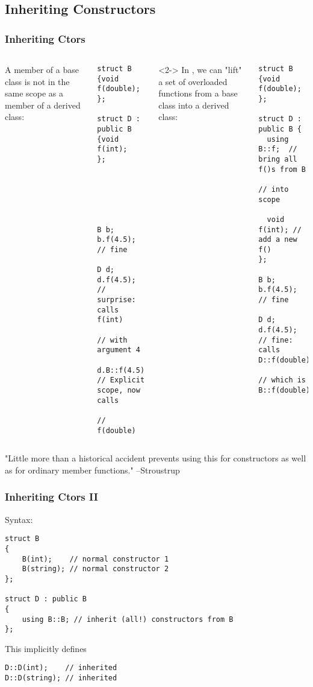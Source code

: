 \subsection{Inheriting Constructors}

\begin{frame}[fragile]
\frametitle{Inheriting Ctors}

\begin{columns}[t]
A member of a base class is not in the same scope as a member of a derived class:
{\scriptsize
\begin{verbatim}
struct B            {void f(double); };

struct D : public B {void f(int);    };






B b;   b.f(4.5);  // fine

D d;   d.f(4.5);  // surprise: calls f(int)
                  // with argument 4

d.B::f(4.5)  // Explicit scope, now calls
             // f(double)
\end{verbatim}
}
<2->
In , we can "lift" a set of overloaded functions from a base class into a derived class:
{\scriptsize
\begin{verbatim}
struct B {void f(double);  };

struct D : public B {
  using B::f;  // bring all f()s from B
               // into scope

  void f(int); // add a new f()
};

B b;   b.f(4.5); // fine

D d;   d.f(4.5); // fine: calls D::f(double)
                 // which is B::f(double)
\end{verbatim}
}
\end{columns}
\pause{}
\vskip 24pt
"Little more than a historical accident prevents using this for
constructors as well as for ordinary member functions." --Stroustrup
\end{frame}

\begin{frame}[fragile]
\frametitle{Inheriting Ctors II}

Syntax:


{\scriptsize
\begin{verbatim}
struct B
{
    B(int);    // normal constructor 1
    B(string); // normal constructor 2
};

struct D : public B
{
    using B::B; // inherit (all!) constructors from B
};
\end{verbatim}
}
This implicitly defines
{\scriptsize
\begin{verbatim}
D::D(int);    // inherited
D::D(string); // inherited
\end{verbatim}
}
\end{frame}


